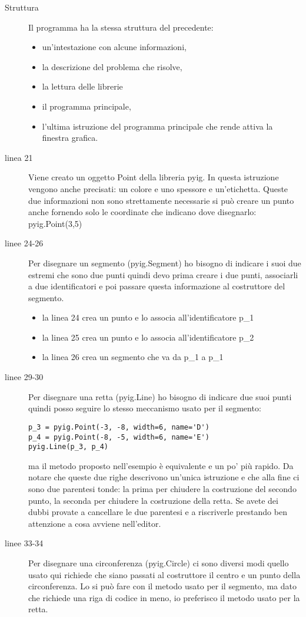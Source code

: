 \begin{description}
 \item [Struttura] 
 Il programma ha la stessa struttura del precedente:
\begin{itemize} [nosep]
 \item un'intestazione con alcune informazioni, 
 \item la descrizione del problema che risolve,
 \item la lettura delle librerie
 \item il programma principale,
 \item l'ultima istruzione del programma principale che rende attiva la 
finestra grafica.
\end{itemize}
 \item [linea 21]
 Viene creato un oggetto {\ttfamily Point} della libreria {\ttfamily pyig}. 
In questa istruzione vengono anche precisati: un colore e uno spessore e 
un'etichetta.
Queste due informazioni non sono strettamente necessarie si può creare un punto 
anche fornendo solo le coordinate che indicano dove disegnarlo:
{\ttfamily pyig.Point(3,5)}
 \item [linee 24-26]
 Per disegnare un segmento ({\ttfamily pyig.Segment}) ho bisogno di indicare i 
suoi due estremi che sono due punti quindi devo prima creare i due punti, 
associarli a due identificatori e poi passare questa informazione al costruttore 
del segmento. 
\begin{itemize} [nosep]
 \item la linea 24 crea un punto e lo associa all'identificatore 
 {\ttfamily p\_1}
 \item la linea 25 crea un punto e lo associa all'identificatore 
 {\ttfamily p\_2}
 \item la linea 26 crea un segmento che va da 
 {\ttfamily p\_1} a {\ttfamily p\_1}
\end{itemize}
 \item [linee 29-30]
 Per disegnare una retta ({\ttfamily pyig.Line}) ho bisogno di indicare due suoi
punti quindi posso seguire lo stesso meccanismo usato per il segmento:
\begin{lstlisting}
p_3 = pyig.Point(-3, -8, width=6, name='D')
p_4 = pyig.Point(-8, -5, width=6, name='E')
pyig.Line(p_3, p_4)
\end{lstlisting}
ma il metodo proposto nell'esempio è equivalente e un po' più rapido.
Da notare che queste due righe descrivono un'unica istruzione e che alla fine 
ci sono due parentesi tonde: la prima per chiudere la costruzione del secondo 
punto, la seconda per chiudere la costruzione della retta.
Se avete dei dubbi provate a cancellare le due parentesi e a riscriverle 
prestando ben attenzione a cosa avviene nell'editor.
 \item [linee 33-34]
 Per disegnare una circonferenza ({\ttfamily pyig.Circle}) ci sono diversi modi 
quello usato qui richiede che siano passati al costruttore il centro e un punto 
della circonferenza. Lo si può fare con il metodo usato per il segmento, ma 
dato che richiede una riga di codice in meno, io preferisco il metodo usato per 
la retta.
\end{description}

